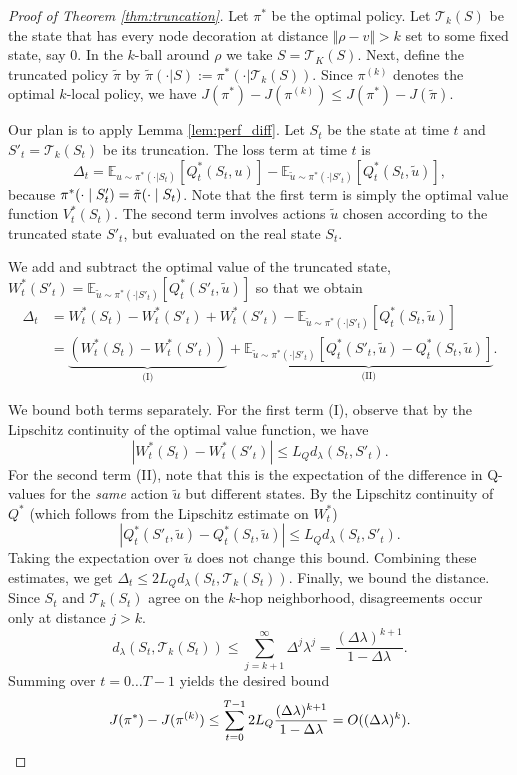 \documentclass{article}
\begin{document}
\begin{proof}[Proof of Theorem \ref{thm:truncation}]
    Let $\pi^*$ be the optimal policy.
    Let $\mathcal T _k (S)$ be the state that has every node decoration at distance $\Vert \rho - v \Vert > k$  set to some fixed state, say $0$. In the $k$-ball around $\rho$ we take $S = \mathcal T _K (S)$. Next, define the truncated policy $\tilde{\pi}$ by $\tilde{\pi}(\cdot|S) := \pi^*(\cdot|\mathcal{T}_k(S))$.
    Since $\pi^{(k)}$ denotes the optimal $k$-local policy, we have $J(\pi^*) - J(\pi^{(k)}) \le J(\pi^*) - J(\tilde{\pi})$.
    
    Our plan is to apply Lemma \ref{lem:perf_diff}. Let $S_t$ be the state at time $t$ and $S'_t = \mathcal{T}_k(S_t)$ be its truncation. The loss term at time $t$ is
    \[
    \Delta_t = \mathbb{E}_{u \sim \pi^*(\cdot|S_t)}[Q_t^*(S_t, u)] - \mathbb{E}_{\tilde{u} \sim \pi^*(\cdot|S'_t)}[Q_t^*(S_t, \tilde{u})],
    \]
    because $\pi^* (\cdot \mid S_t ') = \Tilde{\pi}(\cdot \mid S_t)$.
    Note that the first term is simply the optimal value function $V_t^*(S_t)$. The second term involves actions $\tilde{u}$ chosen according to the truncated state $S'_t$, but evaluated on the real state $S_t$.
    
    We add and subtract the optimal value of the truncated state, $W_t^*(S'_t) = \mathbb{E}_{\tilde{u} \sim \pi^*(\cdot|S'_t)}[Q_t^*(S'_t, \tilde{u})]$ so that we obtain
    \begin{align*}
        \Delta_t &= W_t^*(S_t) - W_t^*(S'_t) + W_t^*(S'_t) - \mathbb{E}_{\tilde{u} \sim \pi^*(\cdot|S'_t)}[Q_t^*(S_t, \tilde{u})] \\
        &= \underbrace{(W_t^*(S_t) - W_t^*(S'_t))}_{\text{(I)}} + \underbrace{\mathbb{E}_{\tilde{u} \sim \pi^*(\cdot|S'_t)} [Q_t^*(S'_t, \tilde{u}) - Q_t^*(S_t, \tilde{u})]}_{\text{(II)}}.
    \end{align*}
    
    We bound both terms separately.
    For the first term (I), observe that by the Lipschitz continuity of the optimal value function, we have
        \[
        |W_t^*(S_t) - W_t^*(S'_t)| \le L_Q d_\lambda(S_t, S'_t).
        \]
        For the second term (II), note that this is the expectation of the difference in Q-values for the \textit{same} action $\tilde{u}$ but different states. By the Lipschitz continuity of $Q^*$ (which follows from the Lipschitz estimate on $W^* _t$)
        \[
        |Q_t^*(S'_t, \tilde{u}) - Q_t^*(S_t, \tilde{u})| \le L_Q d_\lambda(S_t, S'_t).
        \]
        Taking the expectation over $\tilde{u}$ does not change this bound.
    Combining these estimates, we get $\Delta_t \le 2 L_Q d_\lambda(S_t, \mathcal{T}_k(S_t))$. Finally, we bound the distance. Since $S_t$ and $\mathcal{T}_k(S_t)$ agree on the $k$-hop neighborhood, disagreements occur only at distance $j > k$.
    \[
    d_{\lambda}(S_t, \mathcal{T}_k(S_t)) \le \sum_{j=k+1}^\infty \Delta^j \lambda^j = \frac{(\Delta \lambda)^{k+1}}{1 - \Delta \lambda}.
    \]
    Summing over $t=0 \dots T-1$ yields the desired bound
    \[
    J(\pi^*) - J(\pi^{(k)}) \le \sum_{t=0}^{T-1} 2 L_Q \frac{(\Delta \lambda)^{k+1}}{1 - \Delta \lambda} = O((\Delta \lambda)^k). \qedhere
    \]
\end{proof}
\end{document}
